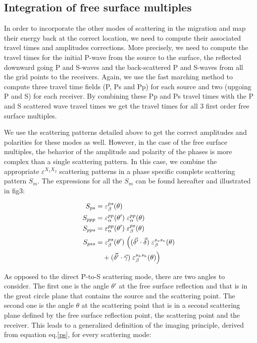\documentclass[9pt,a4paper]{article}
\numberwithin{equation}{section}
\begin{document}
\begin{multicols}{2}
\subsection{Integration of free surface multiples}

In order to incorporate the other modes of scattering in the migration and map their energy back at the correct location, we need to compute their associated travel times and amplitudes corrections.
More precisely, we need to compute the travel times for the initial P-wave from the source to the surface, the reflected downward going P and S-waves and the back-scattered P and S-waves from all the grid points to the receivers.
Again, we use the fast marching method to compute three travel time fields (P, Ps and Pp) for each source and two (upgoing P and S) for each receiver.
By combining these Pp and Ps travel times with the P and S scattered wave travel times we get the travel times for all 3 first order free surface multiples. 

We use the scattering patterns detailed above to get the correct amplitudes and polarities for these modes as well.
However, in the case of the free surface multiples, the behavior of the amplitude and polarity of the phases is more complex than a single scattering pattern.
In this case, we combine the appropriate $\varepsilon^{X_1X_2}$ scattering patterns in a phase specific complete scattering pattern $S_m$.
The expressions for all the $S_m$ can be found hereafter and illustrated in fig3:

\begin{align}
S_{ps}  &= \varepsilon^{ps}_{\beta} (\theta )
\\
S_{ppp} &= \varepsilon^{pp}_{\alpha} (\theta') \; \varepsilon^{pp}_{\alpha} (\theta)
\\
S_{pps} &= \varepsilon^{pp}_{\alpha} (\theta') \; \varepsilon^{ps}_{\beta} (\theta)
\\
S_{pss} &= \varepsilon^{ps}_{\beta} (\theta') \; \Big( (\vec{\delta'} \cdot \vec{\delta}) \; \varepsilon^{s_vs_v}_{\beta} (\theta)
      \notag \\ & \quad + (\vec{\delta'} \cdot \vec{\gamma}) \; \varepsilon^{s_hs_h}_{\beta} (\theta) \Big)
\end{align}
\vspace{1mm}

As opposed to the direct P-to-S scattering mode, there are two angles to consider.
The first one is the angle $\theta'$ at the free surface reflection and that is in the great circle plane that contains the source and the scattering point.
The second one is the angle $\theta$ at the scattering point that is in a second scattering plane defined by the free surface reflection point, the scattering point and the receiver.
This leads to a generalized definition of the imaging principle, derived from equation eq.\eqref{ps}, for every scattering mode:


\end{multicols}
\end{document}
